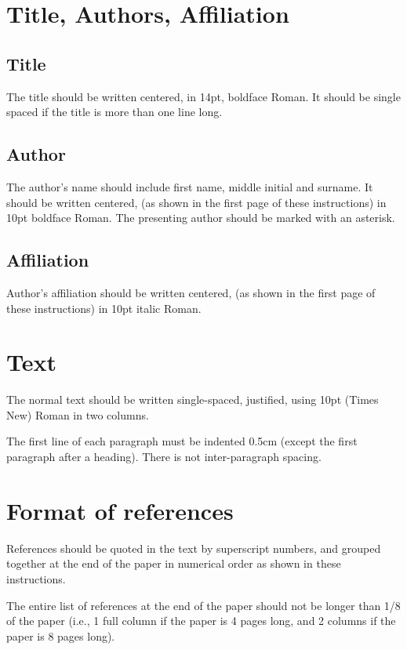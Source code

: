\documentclass[10pt,twocolumn,a4paper]{article}
\begin{document}
\section{Title, Authors, Affiliation}

\subsection{Title}

The title should be written centered, in 14pt, boldface Roman. It should be single spaced if the title is more than one line long.

\subsection{Author}

The author's name should include first name, middle initial and surname. It should be written centered, (as shown in the first page of these instructions) in 10pt boldface Roman. The presenting author should be marked with an asterisk.

\subsection{Affiliation}

Author's affiliation should be written centered, (as shown in the first page of these instructions) in 10pt italic Roman.


\section{Text}

The normal text should be written single-spaced, justified, using 10pt (Times New) Roman in two columns.

The first line of each paragraph must be indented 0.5cm (except the first paragraph after a heading). There is not inter-paragraph spacing.

\section{Format of references}

References should be quoted in the text by superscript numbers\cite{Baeck:92, Deb:2002}, and grouped together at the end of the paper in numerical order as shown in these instructions.

The entire list of references at the end of the paper should not be longer than 1/8 of the paper (i.e., 1 full column if the paper is 4 pages long, and 2 columns if the paper is 8 pages long).


{}

\end{document}
